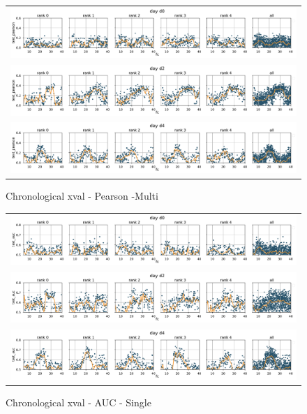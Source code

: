 \documentclass[10pt,a4paper]{article}
\begin{document}
\begin{figure}
\centering
\begin{tabular}{c}
	\includegraphics[width=\perfwidth\textwidth]{figures/par_sweep/test_pearson_fc_d0_Chrono_Multi}\\
	\includegraphics[width=\perfwidth\textwidth]{figures/par_sweep/test_pearson_fc_d2_Chrono_Multi}\\
	\includegraphics[width=\perfwidth\textwidth]{figures//par_sweep/test_pearson_fc_d4_Chrono_Multi}
\end{tabular}
\caption{Chronological xval - Pearson -Multi} 
\end{figure}

\begin{figure}
\centering
\begin{tabular}{c}
	\includegraphics[width=\perfwidth\textwidth]{figures/par_sweep/test_auc_fc_d0_Chrono_Single}\\
	\includegraphics[width=\perfwidth\textwidth]{figures/par_sweep/test_auc_fc_d2_Chrono_Single}\\
	\includegraphics[width=\perfwidth\textwidth]{figures//par_sweep/test_auc_fc_d4_Chrono_Single}
\end{tabular}
\caption{Chronological xval - AUC - Single} 
\end{figure}
\end{document}
